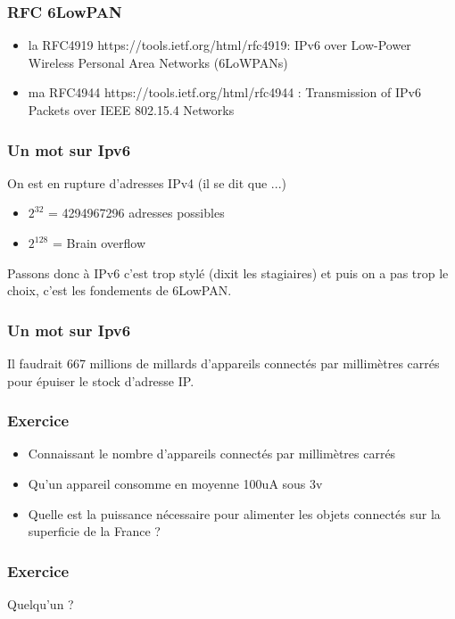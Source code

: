 \documentclass{smilebeamer}
\begin{document}
\begin{frame}
\frametitle{RFC 6LowPAN} 
\begin{itemize}
\item la RFC4919 https://tools.ietf.org/html/rfc4919: IPv6 over Low-Power Wireless Personal Area Networks (6LoWPANs)
\item ma RFC4944 https://tools.ietf.org/html/rfc4944 :  Transmission of IPv6 Packets over IEEE 802.15.4 Networks
\end{itemize}
\end{frame}

\begin{frame}
\frametitle{Un mot sur Ipv6}

On est en rupture d'adresses IPv4 (il se dit que ...)
\newline 
\begin{itemize}
\item $2^{32}$ = 4294967296 adresses possibles
\item $2^{128}$ = Brain overflow
\end{itemize}
 
Passons donc à IPv6 c'est trop stylé (dixit les stagiaires) et puis on
a pas trop le choix, c'est les fondements de 6LowPAN.

\end{frame}

\begin{frame}
\frametitle{Un mot sur Ipv6}

Il faudrait 667 millions de millards d'appareils connectés par millimètres carrés pour épuiser le stock d'adresse IP.

\end{frame}


\begin{frame}
\frametitle{Exercice}
\begin{itemize}
\item Connaissant le nombre d'appareils connectés par millimètres carrés
\item Qu'un appareil consomme en moyenne 100uA sous 3v
\item Quelle est la puissance nécessaire pour alimenter les objets connectés sur la superficie de la France ?
\end{itemize}
\end{frame}

\begin{frame}
\frametitle{Exercice}

Quelqu'un ?

\end{frame}
\end{document}
